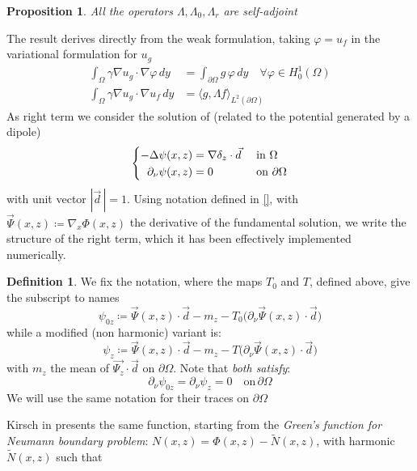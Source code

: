 \documentclass[10pt, a4paper, twoside, openright]{book}
\theoremstyle{definition}
\newtheorem{definition}[subsection]{Definition}
\theoremstyle{plain}
\theoremstyle{plain}
\theoremstyle{plain}
\newtheorem{proposition}[subsection]{Proposition}
\theoremstyle{plain}
\theoremstyle{plain}
\theoremstyle{plain}
\theoremstyle{plain}
\theoremstyle{plain}
\let\phi\varphi
\begin{document}
 \begin{proposition}
  All the operators $\Lambda, \Lambda_0, \Lambda_r$ are self-adjoint
 \end{proposition}
 The result derives directly from the weak formulation, taking $\phi=u_f$ in the variational formulation for $u_g$
 \begin{align}
  \int_{\Omega}\gamma\nabla u_g \cdot \nabla \phi\,dy &= \int_{\partial\Omega}g\,\phi\,dy \quad \forall \phi\in H^1_0(\Omega) \\
  \int_{\Omega}\gamma\nabla u_g \cdot \nabla u_f\,dy &= \langle g, \Lambda f\rangle_{L^2(\partial \Omega)}
 \end{align}
 As right term we consider the solution of (related to the potential generated by a dipole)
 \begin{equation}
 \left\{
 \begin{aligned}
   -\Delta \psi(x,z) &= \nabla\delta_{z} \cdot \vec{d} && \textup{ in }\Omega \\
   \partial_\nu\psi(x,z) &= 0 &&\textup{ on }\partial \Omega
 \end{aligned}
 \right.
 \end{equation}
 with unit vector $|\vec{d}\,|=1$. Using notation defined in \ref{}, with $\vec{\Psi}(x,z)\coloneqq\nabla_x\Phi(x,z)$ the derivative of the fundamental solution, we write the structure of the right term, which it has been effectively implemented numerically.
 \begin{definition}
 \label{def:lsm-psi}
  We fix the notation, where the maps $T_0$ and $T$, defined above, give the subscript to names
 \begin{equation}
 \psi_{0z} \coloneqq \vec{\Psi}(x,z)\cdot\vec{d} - m_z - T_0\bigl(\partial_\nu \vec{\Psi}(x,z) \cdot \vec{d}\bigr)
  \end{equation}
  while a modified (non harmonic) variant is:
  \begin{equation}
  \psi_{z} \coloneqq \vec{\Psi}(x,z)\cdot\vec{d} - m_z - T\bigl(\partial_\nu \vec{\Psi}(x,z) \cdot \vec{d}\bigr)
  \end{equation}
  with $m_z$ the mean of $\vec{\Psi_z}\cdot\vec{d}$ on $\partial \Omega$. Note that \textit{both satisfy}:
  \begin{equation*}
  \partial_\nu \psi_{0z} = \partial_\nu \psi_z = 0\quad\text{on}\,\partial \Omega
  \end{equation*}
  We will use the same notation for their traces on $\partial \Omega$
 \end{definition}
 Kirsch in \cite{kirsch:book} presents the same function, starting from the \emph{Green's function for Neumann boundary problem}: $N(x,z)=\Phi(x,z)-\tilde{N}(x,z)$, with harmonic $\tilde{N}(x,z)$ such that
\end{document}
